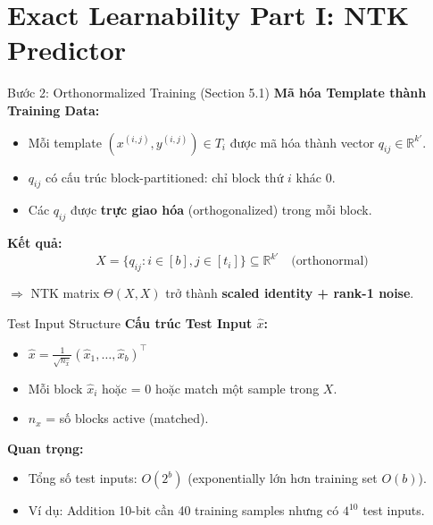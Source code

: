 \section{Exact Learnability Part I: NTK Predictor}

\begin{frame}{Bước 2: Orthonormalized Training (Section 5.1)}
  \textbf{Mã hóa Template thành Training Data:}
  \begin{itemize}
    \item Mỗi template $(x^{(i,j)}, y^{(i,j)}) \in T_i$ được mã hóa thành vector $q_{ij} \in \mathbb{R}^{k'}$.
    \item $q_{ij}$ có cấu trúc block-partitioned: chỉ block thứ $i$ khác 0.
    \item Các $q_{ij}$ được \textbf{trực giao hóa} (orthogonalized) trong mỗi block.
  \end{itemize}

  \vspace{0.3cm}
  \textbf{Kết quả:}
  \[
    X = \{q_{ij} : i \in [b], j \in [t_i]\} \subseteq \mathbb{R}^{k'} \quad \text{(orthonormal)}
  \]
  
  $\Rightarrow$ NTK matrix $\Theta(X,X)$ trở thành \textbf{scaled identity + rank-1 noise}.
\end{frame}

\begin{frame}{Test Input Structure}
  \textbf{Cấu trúc Test Input $\hat{x}$:}
  \begin{itemize}
    \item $\hat{x} = \frac{1}{\sqrt{n_{\hat{x}}}} (\hat{x}_1, \ldots, \hat{x}_b)^\top$
    \item Mỗi block $\hat{x}_i$ hoặc = $0$ hoặc match một sample trong $X$.
    \item $n_{\hat{x}}$ = số blocks active (matched).
  \end{itemize}

  \vspace{0.3cm}
  \textbf{Quan trọng:}
  \begin{itemize}
    \item Tổng số test inputs: $O(2^b)$ (exponentially lớn hơn training set $O(b)$).
    \item Ví dụ: Addition 10-bit cần 40 training samples nhưng có $4^{10}$ test inputs.
  \end{itemize}
\end{frame}

